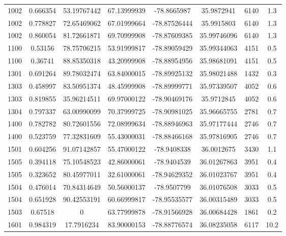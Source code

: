 \documentclass[11pt]{article}
\begin{document}
\begin{longtable*}{|c|c|c|c|c|c|c|c|}
1002  & 0.666354       & 53.19767442       & 67.13999939    & -78.8665987  & 35.9872941  & 6140       & 1.3  \\
1002  & 0.778827       & 72.65469062       & 67.01999664    & -78.87526444 & 35.9915803  & 6140       & 1.3  \\
1002  & 0.860054       & 81.72661871       & 69.70999908    & -78.87609385 & 35.99746096 & 6140       & 1.3  \\
1100  & 0.53156        & 78.75706215       & 53.91999817    & -78.89059429 & 35.99344063 & 4151       & 0.5  \\
1100  & 0.36741        & 88.85350318       & 43.20999908    & -78.88954956 & 35.98681091 & 4151       & 0.5  \\
1301  & 0.691264       & 89.78032474       & 63.84000015    & -78.89925132 & 35.98021488 & 1432       & 0.3  \\
1303  & 0.458997       & 83.50951374       & 48.45999908    & -78.89999771 & 35.97339507 & 4052       & 0.6  \\
1303  & 0.819855       & 35.96214511       & 69.97000122    & -78.90469176 & 35.9712845  & 4052       & 0.6  \\
1304  & 0.797337       & 63.00990099       & 70.37999725    & -78.90981025 & 35.96665755 & 2781       & 0.7  \\
1400  & 0.782782       & 80.72601556       & 72.08999634    & -78.88946963 & 35.97177444 & 2746       & 0.7  \\
1400  & 0.523759       & 77.32831609       & 55.43000031    & -78.88466168 & 35.97816905 & 2746       & 0.7  \\
1501  & 0.604256       & 91.07142857       & 55.47000122    & -78.9408338  & 36.0012675  & 3430       & 1.1  \\
1505  & 0.394118       & 75.10548523       & 42.86000061    & -78.9404539  & 36.01267863 & 3951       & 0.4  \\
1505  & 0.323652       & 80.45977011       & 32.61000061    & -78.94629352 & 36.01023767 & 3951       & 0.4  \\
1504  & 0.476014       & 70.84314649       & 50.56000137    & -78.9507799  & 36.01076508 & 3033       & 0.5  \\
1504  & 0.651928       & 90.42553191       & 60.66999817    & -78.95535577 & 36.00315489 & 3033       & 0.5  \\
1503  & 0.67518        & 0                 & 63.77999878    & -78.91566928 & 36.00684428 & 1861       & 0.2  \\
1601  & 0.984319       & 17.7916234        & 83.90000153    & -78.88776574 & 36.08235058 & 6117       & 10.2 \\

\end{longtable*}
\end{document}
